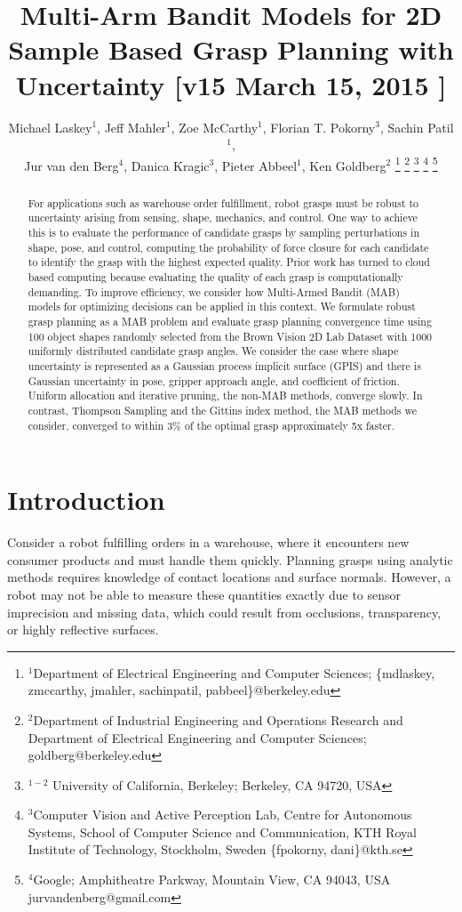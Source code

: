 \documentclass[10pt, conference]{ieeeconf}      %
\title{\LARGE \bf
Multi-Arm Bandit Models for 2D Sample Based Grasp Planning with Uncertainty  [v15 March 15, 2015 ] }
\author{Michael Laskey$^1$, Jeff Mahler$^1$, Zoe McCarthy$^1$,  Florian T. Pokorny$^3$, Sachin Patil$^1$,\\ Jur van den Berg$^4$,  Danica Kragic$^3$, Pieter Abbeel$^1$, Ken Goldberg$^2$%
\thanks{$^1$Department of Electrical Engineering and Computer Sciences; {\small \{mdlaskey, zmccarthy, jmahler, sachinpatil, pabbeel\}@berkeley.edu}}%
\thanks{$^2$Department of Industrial Engineering and Operations Research and Department of Electrical Engineering and Computer Sciences; {\small goldberg@berkeley.edu}}%
\thanks{$^{1-2}$ University of California, Berkeley;  Berkeley, CA 94720, USA}%
\thanks{$^3$Computer Vision and Active Perception Lab, Centre for Autonomous Systems, School of Computer Science and Communication, KTH Royal Institute of Technology, Stockholm, Sweden {\small \{fpokorny, dani\}@kth.se}}%
\thanks{$^4$Google; Amphitheatre Parkway, Mountain View, CA 94043, USA {\small jurvandenberg@gmail.com}}%
}
\begin{document}
\maketitle
\thispagestyle{empty}
\pagestyle{empty}



\begin{abstract}
For applications such as warehouse order fulfillment, robot grasps must be robust to uncertainty arising from sensing, shape, mechanics, and control.  One way to achieve this is to evaluate the performance of candidate grasps by sampling perturbations in shape, pose, and control, computing the probability of force closure for each candidate to identify the grasp with the highest expected quality. Prior work has turned to cloud based computing because evaluating the quality of each grasp is computationally demanding. To improve efficiency, we consider how Multi-Armed Bandit (MAB) models for optimizing decisions can be applied in this context. We formulate robust grasp planning as a MAB problem and evaluate grasp planning convergence time using 100 object shapes randomly selected from the Brown Vision 2D Lab Dataset with 1000 uniformly distributed candidate grasp angles. We consider the case where shape uncertainty is represented as a Gaussian process implicit surface (GPIS) and there is Gaussian uncertainty in pose, gripper approach angle, and coefficient of friction. 
Uniform allocation and iterative pruning, the non-MAB methods, converge slowly.
In contrast, Thompson Sampling and the Gittins index method, the MAB methods we consider, converged to within 3\% of the optimal grasp approximately 5x faster.
\end{abstract}



\section{Introduction}



Consider a robot fulfilling orders in a warehouse, where it encounters new consumer products and must handle them quickly.
Planning grasps using analytic methods requires knowledge of contact locations and surface normals.
However, a robot may not be able to measure these quantities exactly due to sensor imprecision and missing data, which could result from occlusions, transparency, or highly reflective surfaces. 
\end{document}
